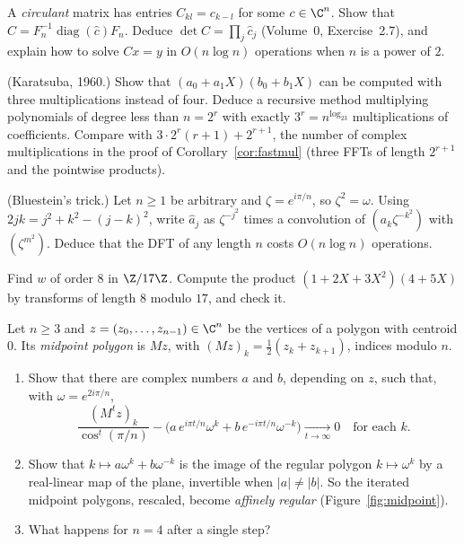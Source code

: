 \begin{exercise}[$\star\star$]\label{ex:circulantfft}
A \emph{circulant} matrix has entries $C_{kl}=c_{k-l}$ for some $c\in\C^n$. Show that $C=F_n^{-1}\operatorname{diag}(\hat c)F_n$. Deduce $\det C=\prod_j\hat c_j$ (Volume~0,
Exercise~2.7), and explain how to solve $Cx=y$ in $O(n\log n)$ operations when $n$ is a power of $2$.
\end{exercise}

\begin{exercise}[$\star\star$]\label{ex:karatsuba}
(Karatsuba, 1960.) Show that $(a_0+a_1X)(b_0+b_1X)$ can be computed with three multiplications instead of four. Deduce a recursive
method multiplying polynomials of degree less than $n=2^r$ with exactly $3^r=n^{\log_23}$ multiplications of coefficients. Compare
with $3\cdot2^r(r+1)+2^{r+1}$, the number of complex multiplications in the proof of Corollary~\ref{cor:fastmul} (three FFTs of length
$2^{r+1}$ and the pointwise products).
\end{exercise}

\begin{exercise}[$\star\star$]\label{ex:bluestein}
(Bluestein's trick.) Let $n\ge1$ be arbitrary and $\zeta=e^{i\pi/n}$, so $\zeta^2=\omega$. Using $2jk=j^2+k^2-(j-k)^2$, write $\hat a_j$ as $\zeta^{-j^2}$ times a
convolution of $(a_k\zeta^{-k^2})$ with $(\zeta^{m^2})$. Deduce that the DFT of any length $n$ costs $O(n\log n)$ operations.
\end{exercise}

\begin{exercise}[$\star\star$]\label{ex:nttsmall}
Find $w$ of order $8$ in $\Z/17\Z$. Compute the product $(1+2X+3X^2)(4+5X)$ by transforms of length $8$ modulo $17$, and check it.
\end{exercise}

\begin{exercise}[$\star\star$]\label{pb:midpoint}
Let $n\ge3$ and $z=(z_0,\dots,z_{n-1})\in\C^n$ be the vertices of a polygon with centroid $0$. Its \emph{midpoint
polygon} is $Mz$, with $(Mz)_k=\frac12(z_k+z_{k+1})$, indices modulo $n$.
\begin{enumerate}[label=(\alph*)]
\item Show that there are complex numbers $a$ and $b$, depending on $z$, such that, with $\omega=e^{2i\pi/n}$,
\[
\frac{(M^tz)_k}{\cos^t(\pi/n)}-\bigl(a\,e^{i\pi t/n}\omega^k+b\,e^{-i\pi t/n}\omega^{-k}\bigr)\xrightarrow[t\to\infty]{}0
\quad\text{for each }k.
\]
\item Show that $k\mapsto a\omega^k+b\omega^{-k}$ is the image of the regular polygon $k\mapsto\omega^k$ by a real-linear
map of the plane, invertible when $|a|\ne|b|$. So the iterated midpoint polygons, rescaled, become \emph{affinely regular}
(Figure~\ref{fig:midpoint}).
\item What happens for $n=4$ after a single step?
\end{enumerate}
\end{exercise}

